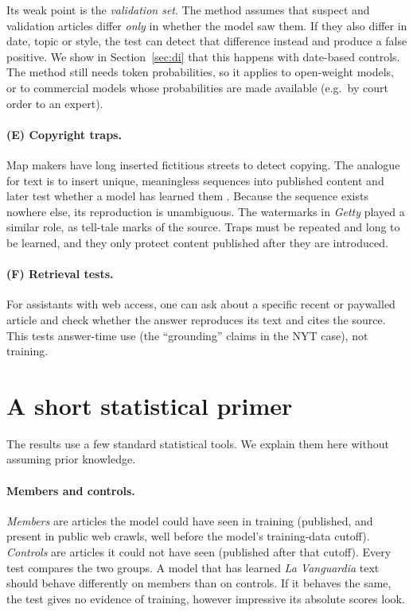 \documentclass[10pt,a4paper]{article}
\begin{document}
Its weak point is the \emph{validation set}. The method assumes that suspect and validation articles differ
\emph{only} in whether the model saw them. If they also differ in date, topic or style, the test can detect that
difference instead and produce a false positive. We show in Section~\ref{sec:di} that this happens with date-based
controls. The method still needs token probabilities, so it applies to open-weight models, or to commercial models
whose probabilities are made available (e.g.\ by court order to an expert).

\paragraph{(E) Copyright traps.} Map makers have long inserted fictitious streets to detect copying. The analogue for
text is to insert unique, meaningless sequences into published content and later test whether a model has learned
them \cite{meeus2024}. Because the sequence exists nowhere else, its reproduction is unambiguous. The watermarks in
\emph{Getty} played a similar role, as tell-tale marks of the source. Traps must be repeated and long to be learned,
and they only protect content published after they are introduced.

\paragraph{(F) Retrieval tests.} For assistants with web access, one can ask about a specific recent or paywalled article
and check whether the answer reproduces its text and cites the source. This tests answer-time use (the ``grounding''
claims in the NYT case), not training.

\section{A short statistical primer}\label{sec:stats}
The results use a few standard statistical tools. We explain them here without assuming prior knowledge.

\paragraph{Members and controls.} \emph{Members} are articles the model could have seen in training (published, and
present in public web crawls, well before the model's training-data cutoff). \emph{Controls} are articles it could
not have seen (published after that cutoff). Every test compares the two groups. A model that has learned
\emph{La Vanguardia} text should behave differently on members than on controls. If it behaves the same, the test
gives no evidence of training, however impressive its absolute scores look.
\end{document}

